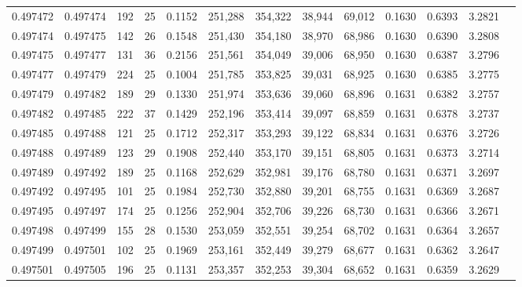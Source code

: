 \begin{tabular}{rrrrrrrrrrrrr}
0.497472 & 0.497474 & 192 &  25 &                                     0.1152 & 251,288 & 354,322 &  38,944 &  69,012 & 0.1630 & 0.6393 & 3.2821 \\
0.497474 & 0.497475 & 142 &  26 &                                     0.1548 & 251,430 & 354,180 &  38,970 &  68,986 & 0.1630 & 0.6390 & 3.2808 \\
0.497475 & 0.497477 & 131 &  36 &                                     0.2156 & 251,561 & 354,049 &  39,006 &  68,950 & 0.1630 & 0.6387 & 3.2796 \\
0.497477 & 0.497479 & 224 &  25 &                                     0.1004 & 251,785 & 353,825 &  39,031 &  68,925 & 0.1630 & 0.6385 & 3.2775 \\
0.497479 & 0.497482 & 189 &  29 &                                     0.1330 & 251,974 & 353,636 &  39,060 &  68,896 & 0.1631 & 0.6382 & 3.2757 \\
0.497482 & 0.497485 & 222 &  37 &                                     0.1429 & 252,196 & 353,414 &  39,097 &  68,859 & 0.1631 & 0.6378 & 3.2737 \\
0.497485 & 0.497488 & 121 &  25 &                                     0.1712 & 252,317 & 353,293 &  39,122 &  68,834 & 0.1631 & 0.6376 & 3.2726 \\
0.497488 & 0.497489 & 123 &  29 &                                     0.1908 & 252,440 & 353,170 &  39,151 &  68,805 & 0.1631 & 0.6373 & 3.2714 \\
0.497489 & 0.497492 & 189 &  25 &                                     0.1168 & 252,629 & 352,981 &  39,176 &  68,780 & 0.1631 & 0.6371 & 3.2697 \\
0.497492 & 0.497495 & 101 &  25 &                                     0.1984 & 252,730 & 352,880 &  39,201 &  68,755 & 0.1631 & 0.6369 & 3.2687 \\
0.497495 & 0.497497 & 174 &  25 &                                     0.1256 & 252,904 & 352,706 &  39,226 &  68,730 & 0.1631 & 0.6366 & 3.2671 \\
0.497498 & 0.497499 & 155 &  28 &                                     0.1530 & 253,059 & 352,551 &  39,254 &  68,702 & 0.1631 & 0.6364 & 3.2657 \\
0.497499 & 0.497501 & 102 &  25 &                                     0.1969 & 253,161 & 352,449 &  39,279 &  68,677 & 0.1631 & 0.6362 & 3.2647 \\
0.497501 & 0.497505 & 196 &  25 &                                     0.1131 & 253,357 & 352,253 &  39,304 &  68,652 & 0.1631 & 0.6359 & 3.2629 \\

\end{tabular}

